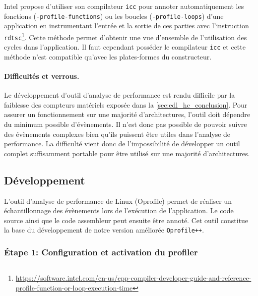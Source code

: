         Intel propose d'utiliser son compilateur \verb=icc= pour annoter automatiquement les fonctions (\verb=-profile-functions=) ou les boucles (\verb=-profile-loops=) d'une application en instrumentant l'entrée et la sortie de ces parties avec l'instruction \verb=rdtsc=\footnote{\url{https://software.intel.com/en-us/cpp-compiler-developer-guide-and-reference-profile-function-or-loop-execution-time}}. Cette méthode permet d'obtenir une vue d'ensemble de l'utilisation des cycles dans l'application. Il faut cependant posséder le compilateur \verb=icc= et cette méthode n'est compatible qu'avec les plates-formes du constructeur. 
        
        
        \paragraph{Difficultés et verrous.} Le développement d'outil d'analyse de performance est rendu difficile par la faiblesse des compteurs matériels exposée dans la \autoref{sec:edl_hc_conclusion}. Pour assurer un fonctionnement sur une majorité d'architectures, l'outil doit dépendre du minimum possible d'évènements. Il n'est donc pas possible de pouvoir suivre des évènements complexes bien qu'ils puissent être utiles dans l'analyse de performance. La difficulté vient donc de l'impossibilité de développer un outil complet suffisamment portable pour être utilisé sur une majorité d'architectures. 
        

\subsection{Développement}

    L'outil d'analyse de performance de Linux (Oprofile) permet de réaliser un échantillonnage des évènements lors de l'exécution de l'application. Le code source ainsi que le code assembleur peut ensuite être annoté. Cet outil constitue la base du développement de notre version améliorée \verb=Oprofile++=.
    
    \subsubsection{Étape 1: Configuration et activation du profiler}
        
